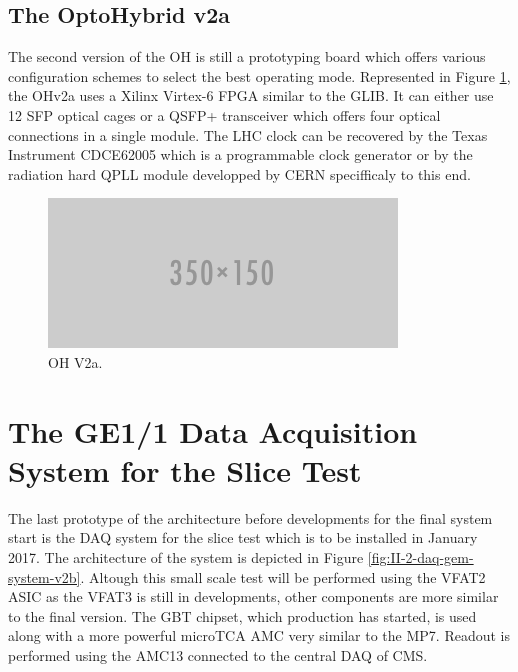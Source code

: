    \subsection{The OptoHybrid v2a}

      The second version of the OH is still a prototyping board which offers various configuration schemes to select the best operating mode. Represented in Figure \ref{fig:II-2-daq-ohv2a}, the OHv2a uses a Xilinx Virtex-6 FPGA similar to the GLIB. It can either use 12 SFP optical cages or a QSFP+ transceiver which offers four optical connections in a single module. The LHC clock can be recovered by the Texas Instrument CDCE62005 which is a programmable clock generator or by the radiation hard QPLL module developped by CERN specifficaly to this end.

      \begin{figure}[h!]
        \centering
        \includegraphics[width=\textwidth]{img/empty.png}
        \caption{OH V2a.}
        \label{fig:II-2-daq-ohv2a}
      \end{figure}

  \section{The GE1/1 Data Acquisition System for the Slice Test}

    The last prototype of the architecture before developments for the final system start is the DAQ system for the slice test which is to be installed in January 2017. The architecture of the system is depicted in Figure \ref{fig:II-2-daq-gem-system-v2b}. Altough this small scale test will be performed using the VFAT2 ASIC as the VFAT3 is still in developments, other components are more similar to the final version. The GBT chipset, which production has started, is used along with a more powerful microTCA AMC very similar to the MP7. Readout is performed using the AMC13 connected to the central DAQ of CMS.

